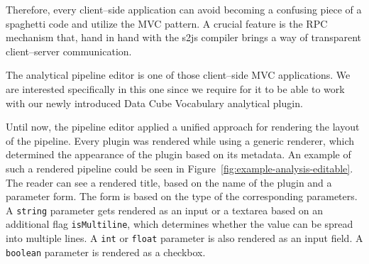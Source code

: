 Therefore, every client--side application can avoid becoming a confusing piece of a
spaghetti code and utilize the MVC pattern. A crucial feature is the RPC 
mechanism that, hand in hand with the s2js compiler brings a way of transparent 
client--server communication.

The analytical pipeline editor is one of those client--side MVC applications. We 
are interested specifically in this one since we require for it to be able to work 
with our newly introduced Data Cube Vocabulary analytical plugin.

Until now, the pipeline editor applied a unified approach for rendering the 
layout of the pipeline. Every plugin was rendered while using a generic 
renderer, which determined the appearance of the plugin based on its metadata. An 
example of such a rendered pipeline could be seen in
Figure~\ref{fig:example-analysis-editable}. The reader can see a rendered title, based on 
the name of the plugin and a parameter form. The form is based on the type of the 
corresponding parameters. A \texttt{string} parameter gets rendered as an input or a textarea based on
an additional flag \texttt{isMultiline}, which determines whether the value can be spread into multiple lines.
A \texttt{int} or \texttt{float} parameter is also rendered as an input field. A \texttt{boolean} parameter 
is rendered as a checkbox.

